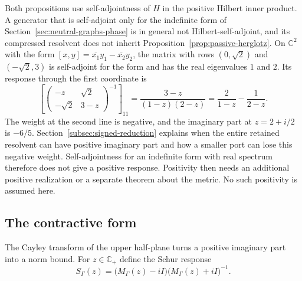 \documentclass[11pt]{article}
\theoremstyle{definition}
\newcommand{\C}{\mathbb C}
\begin{document}
Both propositions use self-adjointness of $H$ in the positive Hilbert inner product. A generator that is self-adjoint only for the indefinite form of Section~\ref{sec:neutral-graphs-phase} is in general not Hilbert-self-adjoint, and its compressed resolvent does not inherit Proposition~\ref{prop:passive-herglotz}. On $\C^2$ with the form $[x,y]=\overline{x_1}y_1-\overline{x_2}y_2$, the matrix with rows $(0,\sqrt2)$ and $(-\sqrt2,3)$ is self-adjoint for the form and has the real eigenvalues $1$ and $2$. Its response through the first coordinate is
\begin{equation}
 \left[\begin{pmatrix}-z&\sqrt2\\-\sqrt2&3-z\end{pmatrix}^{-1}\right]_{11}
   =\frac{3-z}{(1-z)(2-z)}=\frac{2}{1-z}-\frac{1}{2-z} .
 \label{eq:passive-signed-witness}
\end{equation}
The weight at the second line is negative, and the imaginary part at $z=2+i/2$ is $-6/5$. Section~\ref{subsec:signed-reduction} explains when the entire retained resolvent can have positive imaginary part and how a smaller port can lose this negative weight. Self-adjointness for an indefinite form with real spectrum therefore does not give a positive response. Positivity then needs an additional positive realization or a separate theorem about the metric. No such positivity is assumed here.

\subsection{The contractive form}
\label{subsec:passive-cayley}

The Cayley transform of the upper half-plane turns a positive imaginary part into a norm bound. For $z\in\C_+$ define the Schur response
\begin{equation}
 S_\Gamma(z)=\bigl(M_\Gamma(z)-iI\bigr)\bigl(M_\Gamma(z)+iI\bigr)^{-1}.
 \label{eq:passive-schur-response}
\end{equation}
\end{document}
